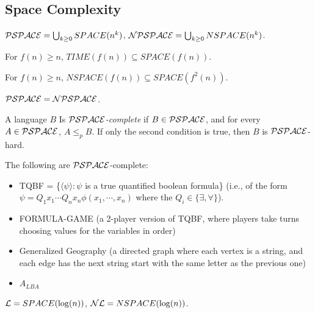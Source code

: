 \subsection{Space Complexity}

\begin{definition}
$\mathcal{PSPACE} = \bigcup_{k \ge 0} SPACE(n^k)$, $\mathcal{NPSPACE} = \bigcup_{k \ge 0} NSPACE(n^k)$.
\end{definition}

\begin{theorem}
For $f(n) \ge n$, $TIME(f(n)) \subseteq SPACE(f(n))$.
\end{theorem}

\begin{theorem}
For $f(n) \ge n$, $NSPACE(f(n)) \subseteq SPACE(f^2(n))$.
\end{theorem}

\begin{corollary}
$\mathcal{PSPACE} = \mathcal{NPSPACE}$.
\end{corollary}

\begin{definition}
A language $B$ Is \emph{$\mathcal{PSPACE}$-complete} if $B \in \mathcal{PSPACE}$, and for every $A \in \mathcal{PSPACE}$, $A \le_p B$. If only the second condition is true, then $B$ is $\mathcal{PSPACE}$-hard.
\end{definition}

\begin{theorem}
The following are $\mathcal{PSPACE}$-complete:
\begin{itemize}
\item TQBF = \{$\langle\psi\rangle : \psi$ is a true quantified boolean formula\} (i.e., of the form $\psi = Q_1x_1\cdots Q_nx_n\phi(x_1,\cdots,x_n)$ where the $Q_i \in \{\exists, \forall\}$).
\item FORMULA-GAME (a 2-player version of TQBF, where players take turns choosing values for the variables in order)
\item Generalized Geography (a directed graph where each vertex is a string, and each edge has the next string start with the same letter as the previous one)
\item $A_{LBA}$
\end{itemize}
\end{theorem}

\begin{definition}
$\mathcal{L} = SPACE(\log(n))$, $\mathcal{NL} = NSPACE(\log(n))$.
\end{definition}

